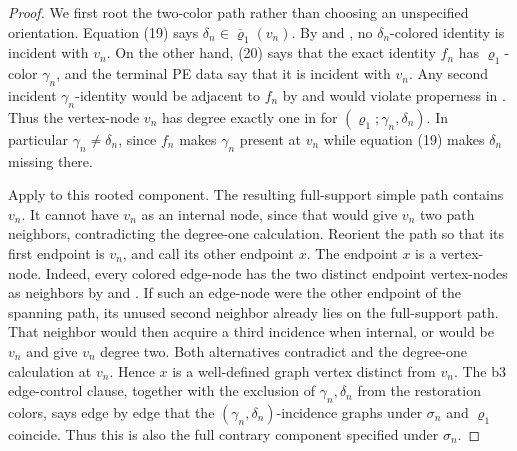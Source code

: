 \begin{proof}
We first root the two-color path rather than choosing an unspecified
orientation.  Equation (19) says
\(\delta_n\in\overline\varrho_1(v_n)\).  By
 and , no
\(\delta_n\)-colored identity is incident with \(v_n\).  On the other
hand, (20) says that the exact identity \(f_n\) has
\(\varrho_1\)-color \(\gamma_n\), and the terminal PE data say that it is
incident with \(v_n\).  Any second incident \(\gamma_n\)-identity would
be adjacent to \(f_n\) by  and would violate
properness in .  Thus the vertex-node
\(v_n\) has degree exactly one in
 for
\((\varrho_1;\gamma_n,\delta_n)\).  In particular
\(\gamma_n\ne\delta_n\), since \(f_n\) makes \(\gamma_n\) present at
\(v_n\) while equation (19) makes \(\delta_n\) missing there.

Apply  to this rooted component.
The resulting full-support simple path contains \(v_n\).  It cannot have
\(v_n\) as an internal node, since that would give \(v_n\) two path
neighbors, contradicting the degree-one calculation.  Reorient the path
so that its first endpoint is \(v_n\), and call its other endpoint \(x\).
The endpoint \(x\) is a vertex-node.  Indeed, every colored edge-node has
the two distinct endpoint vertex-nodes as neighbors by
 and
.  If
such an edge-node were the other endpoint of the spanning path, its unused
second neighbor already lies on the full-support path.  That neighbor
would then acquire a third incidence when internal, or would be \(v_n\)
and give \(v_n\) degree two.  Both alternatives contradict
 and the degree-one calculation
at \(v_n\).  Hence \(x\) is a well-defined graph vertex distinct from
\(v_n\).  The b3 edge-control clause, together with the exclusion of
\(\gamma_n,\delta_n\) from the restoration colors, says edge by edge that
the \((\gamma_n,\delta_n)\)-incidence graphs under \(\sigma_n\) and
\(\varrho_1\) coincide.  Thus this is also the full contrary component
specified under \(\sigma_n\).


\end{proof}
